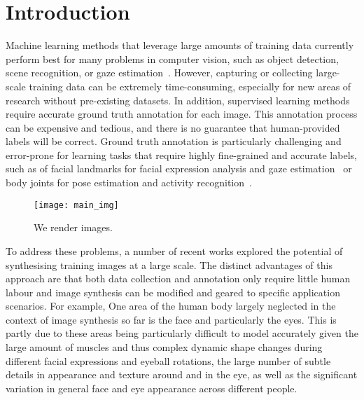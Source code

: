 
\section{Introduction}


Machine learning methods that leverage large amounts of training data currently perform best for many problems in computer vision, such as object detection, scene recognition, or gaze estimation~\cite{zhou2014learning,girshick2014rich,zhang15_cvpr}.
However, capturing or collecting large-scale training data can be extremely time-consuming, especially for new areas of research without pre-existing datasets.
In addition, supervised learning methods require accurate ground truth annotation for each image.
This annotation process can be expensive and tedious, and there is no guarantee that human-provided labels will be correct.
Ground truth annotation is particularly challenging and error-prone for learning tasks that require highly fine-grained and accurate labels, such as of facial landmarks for facial expression analysis and gaze estimation~ or body joints for pose estimation and activity recognition~.

\begin{figure}
    \texttt{[image: main\_img]}
    \caption{We render images.}
    \label{fig:teaser}
\end{figure}

To address these problems, a number of recent works explored the potential of synthesising training images at a large scale.
The distinct advantages of this approach are that both data collection and annotation only require little human labour and image synthesis can be modified and geared to specific application scenarios.
For example, 
One area of the human body largely neglected in the context of image synthesis so far is the face and particularly the eyes.
This is partly due to these areas being particularly difficult to model accurately given the large amount of muscles and thus complex dynamic shape changes during different facial expressions and eyeball rotations, the large number of subtle details in appearance and texture around and in the eye, as well as the significant variation in general face and eye appearance across different people.

